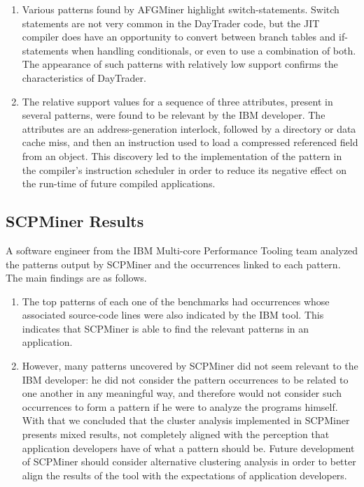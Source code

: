 \begin{enumerate}
\item Various patterns found by AFGMiner highlight switch-statements. Switch statements are not very common in the DayTrader code, but the JIT compiler does have an opportunity to convert between branch tables and if-statements when handling conditionals, or even to use a combination of both. The appearance of such patterns with relatively low support confirms the characteristics of DayTrader.
\item The relative support values for a sequence of three attributes, present in several patterns, were found to be relevant by the IBM developer. The attributes are an address-generation interlock, followed by a directory or data cache miss, and then an instruction used to load a compressed referenced field from an object. This discovery led to the implementation of the pattern in the compiler's instruction scheduler in order to reduce its negative effect on the run-time of future compiled applications.
\end{enumerate}
\subsection{SCPMiner Results}
A software engineer from the IBM Multi-core Performance Tooling team analyzed the patterns output by SCPMiner and the occurrences linked to each pattern. The main findings are as follows.

\begin{enumerate}
\item The top patterns of each one of the benchmarks had occurrences whose associated source-code lines were also indicated by the IBM tool. This indicates that SCPMiner is able to find the relevant patterns in an application.
\item However, many patterns uncovered by SCPMiner did not seem relevant to the IBM developer: he did not consider the pattern occurrences to be related to one another in any meaningful way, and therefore would not consider such occurrences to form a pattern if he were to analyze the programs himself. With that we concluded that the cluster analysis implemented in SCPMiner presents mixed results, not completely aligned with the perception that application developers have of what a pattern should be. Future development of SCPMiner should consider alternative clustering analysis in order to better align the results of the tool with the expectations of application developers.
\end{enumerate}
